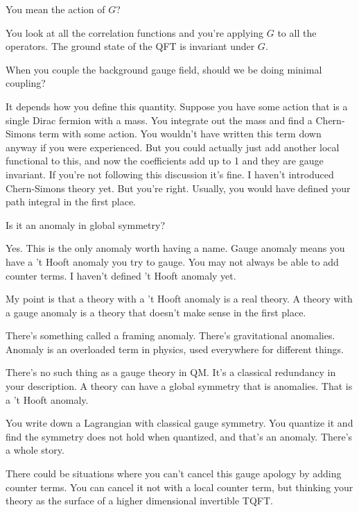 \begin{question}
    You mean the action of $G$?
\end{question}
You look at all the correlation functions and you're applying $G$ to all the
operators.
The ground state of the QFT is invariant under $G$.

\begin{question}
    When you couple the background gauge field,
    should we be doing minimal coupling?
\end{question}
It depends how you define this quantity.
Suppose you have some action that is a single Dirac fermion with a mass.
You integrate out the mass
and find a Chern-Simons term with some action.
You wouldn't have written this term down anyway if you were experienced.
But you could actually just add another local functional to this,
and now the coefficients add up to 1 and they are gauge invariant.
If you're not following this discussion it's fine.
I haven't introduced Chern-Simons theory yet.
But you're right.
Usually, you would have defined your path integral in the first place.

\begin{question}
    Is it an anomaly in global symmetry?
\end{question}
Yes. This is the only anomaly worth having a name.
Gauge anomaly means you have a 't Hooft anomaly you try to gauge.
You may not always be able to add counter terms.
I haven't defined 't Hooft anomaly yet.

My point is that a theory with a 't Hooft anomaly is a real theory.
A theory with a gauge anomaly is a theory that doesn't make sense in the first
place.

There's something called a framing anomaly.
There's gravitational anomalies.
Anomaly is an overloaded term in physics,
used everywhere for different things.

There's no such thing as a gauge theory in QM.
It's a classical redundancy in your description.
A theory can have a global symmetry that is anomalies.
That is a 't Hooft anomaly.

You write down a Lagrangian with classical gauge symmetry.
You quantize it and find the symmetry does not hold when quantized,
and that's an anomaly.
There's a whole story.

There could be situations where you can't cancel this gauge apology by adding
counter terms.
You can cancel it not with a local counter term,
but thinking your theory as the surface of a higher dimensional invertible
TQFT.

